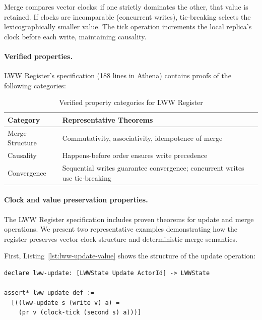 Merge compares vector clocks: if one strictly dominates the other, that value is retained. If clocks are incomparable (concurrent writes), tie-breaking selects the lexicographically smaller value. The tick operation increments the local replica's clock before each write, maintaining causality.

\paragraph{Verified properties.} LWW Register's specification (188 lines in Athena) contains proofs of the following categories:

\begin{table}[h]
  \centering
  \small
  \begin{tabular}{lp{5cm}}
    \toprule
    \textbf{Category} & \textbf{Representative Theorems}\\
    \midrule
    Merge Structure & Commutativity, associativity, idempotence of merge \\
    \midrule
    Causality & Happens-before order ensures write precedence \\
    \midrule
    Convergence & Sequential writes guarantee convergence; concurrent writes use tie-breaking \\
    \bottomrule
  \end{tabular}
  \caption{Verified property categories for LWW Register}
  \label{tab:lww-theorems}
\end{table}

\paragraph{Clock and value preservation properties.} The LWW Register specification includes proven theorems for update and merge operations. We present two representative examples demonstrating how the register preserves vector clock structure and deterministic merge semantics.

First, Listing~\ref{lst:lww-update-value} shows the structure of the update operation:

\begin{lstlisting}[language=Athena,style=athena,label={lst:lww-update-value},caption={LWW Register: Update definition}]
declare lww-update: [LWWState Update ActorId] -> LWWState

assert* lww-update-def :=
  [((lww-update s (write v) a) =
    (pr v (clock-tick (second s) a)))]
\end{lstlisting}

